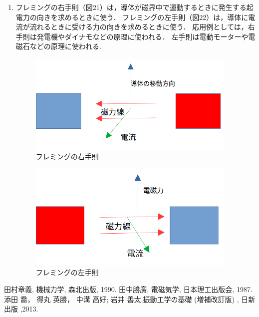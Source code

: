 \documentclass[a4paper,10.5pt]{jsarticle}
\begin{document}
\begin{enumerate}
  \item 
  フレミングの右手則（図21）は，導体が磁界中で運動するときに発生する起電力の向きを求めるときに使う．
  フレミングの左手則（図22）は，導体に電流が流れるときに受ける力の向きを求めるときに使う．
  応用例としては，右手則は発電機やダイナモなどの原理に使われる．
  左手則は電動モーターや電磁石などの原理に使われる. 
  \newpage
  \begin{figure}[h]
    \centering
    \includegraphics[width=10cm]{12.png}
    \caption{フレミングの右手則}
  \end{figure}
  \begin{figure}[h]
    \centering
    \includegraphics[width=10cm]{13.png}
    \caption{フレミングの左手則}
  \end{figure}
\end{enumerate}

\begin{thebibliography}{20}
  \bibitem{} 
  田村章義, 機械力学, 森北出版, 1990.
  \bibitem{}
  田中勝廣, 電磁気学, 日本理工出版会, 1987.
  \bibitem{}
  添田 喬， 得丸 英勝， 中溝 高好; 岩井 善太,振動工学の基礎 (増補改訂版)  , 日新出版 ,2013. 
 \end{thebibliography}
\end{document}
